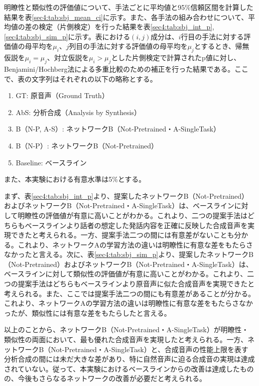 \documentclass[12pt]{jarticle}
\numberwithin{equation}{section}    %
\numberwithin{figure}{section}      %
\numberwithin{table}{section}      %
\begin{document}
明瞭性と類似性の評価値について、手法ごとに平均値と95\%信頼区間を計算した結果を表\ref{sec4:tab:sbj_mean_ci}に示す。また、各手法の組み合わせについて、平均値の差の検定（片側検定）を行った結果を表\ref{sec4:tab:sbj_int_p}, \ref{sec4:tab:sbj_sim_p}に示す。表における$(i, j)$成分は、$i$行目の手法に対する評価値の母平均を$\mu_{i}$、$j$列目の手法に対する評価値の母平均を$\mu_{j}$とするとき、帰無仮説を$\mu_{i} = \mu_{j}$、対立仮説を$\mu_{i} > \mu_{j}$とした片側検定で計算されたp値に対し、Benjamini/Hochberg法による多重比較のための補正を行った結果である。ここで、表の文字列はそれぞれの以下の略称とする。
\begin{enumerate}
    \item GT: 原音声（Ground Truth）
    \item AbS: 分析合成（Analysis by Synthesis）
    \item B（N-P, A-S）: ネットワークB（Not-Pretrained・A-SingleTask）
    \item B（N-P）: ネットワークB（Not-Pretrained）
    \item Baseline: ベースライン
\end{enumerate}
また、本実験における有意水準は5\%とする。

まず、表\ref{sec4:tab:sbj_int_p}より、提案したネットワークB（Not-Pretrained）およびネットワークB（Not-Pretrained・A-SingleTask）は、ベースラインに対して明瞭性の評価値が有意に高いことがわかる。これより、二つの提案手法はどちらもベースラインより話者の想定した発話内容を正確に反映した合成音声を実現できたと考えられる。一方、提案手法二つの間には有意差がないことも分かる。これより、ネットワークAの学習方法の違いは明瞭性に有意な差をもたらさなかったと言える。次に、表\ref{sec4:tab:sbj_sim_p}より、提案したネットワークB（Not-Pretrained）およびネットワークB（Not-Pretrained・A-SingleTask）は、ベースラインに対して類似性の評価値が有意に高いことがわかる。これより、二つの提案手法はどちらもベースラインより原音声に似た合成音声を実現できたと考えられる。また、ここでは提案手法二つの間にも有意差があることが分かる。これより、ネットワークAの学習方法の違いは明瞭性に有意な差をもたらさなかったが、類似性には有意な差をもたらしたと言える。

以上のことから、ネットワークB（Not-Pretrained・A-SingleTask）が明瞭性・類似性の両面において、最も優れた合成音声を実現したと考えられる。一方、ネットワークB（Not-Pretrained・A-SingleTask）と、合成音声の性能上限を表す分析合成の間には未だ大きな差があり、特に自然音声に迫る合成音の実現は達成されていない。従って、本実験におけるベースラインからの改善は達成したものの、今後もさらなるネットワークの改善が必要だと考えられる。
\end{document}
